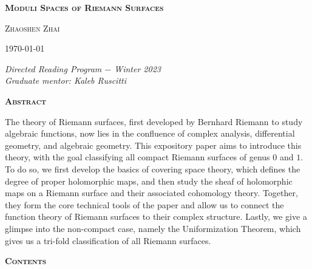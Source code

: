\pagestyle{empty}
\begin{center}
    \Large\textbf{\textsc{Moduli Spaces of Riemann Surfaces}}
    \\[1.2\baselineskip]
    \begin{center}
        \large{\textsc{Zhaoshen Zhai}}
    \end{center}
    \normalsize\today
\end{center}
\vspace*{0.01\textheight}
\hspace{0.2in}\textit{Directed Reading Program $-$ Winter 2023}
\\[0.3\baselineskip]
\hspace*{0.19in}\textit{Graduate mentor: Kaleb Ruscitti}
\\[0.3\baselineskip]
\begin{center}
    \textsc{\bfseries Abstract}
    \\[1.5\baselineskip]
    \begin{minipage}{0.85\textwidth}
        The theory of Riemann surfaces, first developed by Bernhard Riemann to study algebraic functions, now lies in the confluence of complex analysis, differential geometry, and algebraic geometry. This expository paper aims to introduce this theory, with the goal classifying all compact Riemann surfaces of genus $0$ and $1$. To do so, we first develop the basics of covering space theory, which defines the degree of proper holomorphic maps, and then study the sheaf of holomorphic maps on a Riemann surface and their associated cohomology theory. Together, they form the core technical tools of the paper and allow us to connect the function theory of Riemann surfaces to their complex structure. Lastly, we give a glimpse into the non-compact case, namely the Uniformization Theorem, which gives us a tri-fold classification of all Riemann surfaces.
    \end{minipage}
\end{center}
\vspace*{0.02\textheight}
\begin{center}
    \textsc{\bfseries Contents}
\end{center}

\toccontents
\clearpage
\pagestyle{fancyplain}
\fancyhead[L,C,R]{}
\fancyfoot[L,R]{}
\fancyfoot[C]{\thepage}
\renewcommand{\headrulewidth}{0pt}
\setcounter{page}{1}
